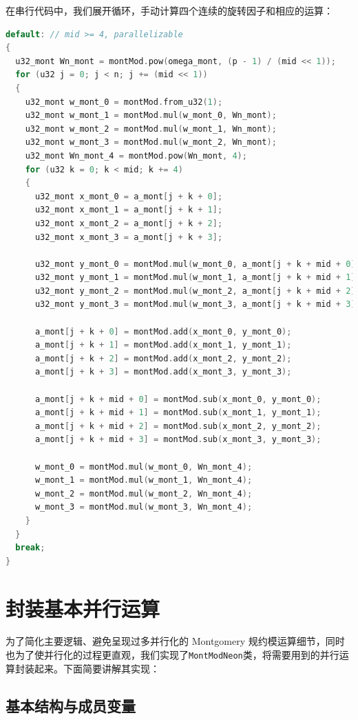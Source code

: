 \documentclass[a4paper]{article}
\begin{document}
在串行代码中，我们展开循环，手动计算四个连续的旋转因子和相应的运算：

\begin{lstlisting}[language=C++]
default: // mid >= 4, parallelizable
{
  u32_mont Wn_mont = montMod.pow(omega_mont, (p - 1) / (mid << 1));
  for (u32 j = 0; j < n; j += (mid << 1))
  {
    u32_mont w_mont_0 = montMod.from_u32(1);
    u32_mont w_mont_1 = montMod.mul(w_mont_0, Wn_mont);
    u32_mont w_mont_2 = montMod.mul(w_mont_1, Wn_mont);
    u32_mont w_mont_3 = montMod.mul(w_mont_2, Wn_mont);
    u32_mont Wn_mont_4 = montMod.pow(Wn_mont, 4);
    for (u32 k = 0; k < mid; k += 4)
    {
      u32_mont x_mont_0 = a_mont[j + k + 0];
      u32_mont x_mont_1 = a_mont[j + k + 1];
      u32_mont x_mont_2 = a_mont[j + k + 2];
      u32_mont x_mont_3 = a_mont[j + k + 3];

      u32_mont y_mont_0 = montMod.mul(w_mont_0, a_mont[j + k + mid + 0]);
      u32_mont y_mont_1 = montMod.mul(w_mont_1, a_mont[j + k + mid + 1]);
      u32_mont y_mont_2 = montMod.mul(w_mont_2, a_mont[j + k + mid + 2]);
      u32_mont y_mont_3 = montMod.mul(w_mont_3, a_mont[j + k + mid + 3]);

      a_mont[j + k + 0] = montMod.add(x_mont_0, y_mont_0);
      a_mont[j + k + 1] = montMod.add(x_mont_1, y_mont_1);
      a_mont[j + k + 2] = montMod.add(x_mont_2, y_mont_2);
      a_mont[j + k + 3] = montMod.add(x_mont_3, y_mont_3);

      a_mont[j + k + mid + 0] = montMod.sub(x_mont_0, y_mont_0);
      a_mont[j + k + mid + 1] = montMod.sub(x_mont_1, y_mont_1);
      a_mont[j + k + mid + 2] = montMod.sub(x_mont_2, y_mont_2);
      a_mont[j + k + mid + 3] = montMod.sub(x_mont_3, y_mont_3);

      w_mont_0 = montMod.mul(w_mont_0, Wn_mont_4);
      w_mont_1 = montMod.mul(w_mont_1, Wn_mont_4);
      w_mont_2 = montMod.mul(w_mont_2, Wn_mont_4);
      w_mont_3 = montMod.mul(w_mont_3, Wn_mont_4);
    }
  }
  break;
}
\end{lstlisting}

\section{封装基本并行运算}\label{sec:parallel_ops}

为了简化主要逻辑、避免呈现过多并行化的 Montgomery 规约模运算细节，同时也为了使并行化的过程更直观，我们实现了\texttt{MontModNeon}类，将需要用到的并行运算封装起来。下面简要讲解其实现：

\subsection{基本结构与成员变量}
\end{document}
